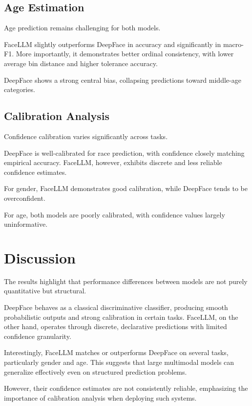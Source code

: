 \documentclass[a4paper,11pt,twocolumn]{article}
\begin{document}
\subsection{Age Estimation}

Age prediction remains challenging for both models.

FaceLLM slightly outperforms DeepFace in accuracy and significantly in macro-F1. More importantly, it demonstrates better ordinal consistency, with lower average bin distance and higher tolerance accuracy.

DeepFace shows a strong central bias, collapsing predictions toward middle-age categories.

\subsection{Calibration Analysis}

Confidence calibration varies significantly across tasks.

DeepFace is well-calibrated for race prediction, with confidence closely matching empirical accuracy. FaceLLM, however, exhibits discrete and less reliable confidence estimates.

For gender, FaceLLM demonstrates good calibration, while DeepFace tends to be overconfident.

For age, both models are poorly calibrated, with confidence values largely uninformative.

\section{Discussion}

The results highlight that performance differences between models are not purely quantitative but structural.

DeepFace behaves as a classical discriminative classifier, producing smooth probabilistic outputs and strong calibration in certain tasks. FaceLLM, on the other hand, operates through discrete, declarative predictions with limited confidence granularity.

Interestingly, FaceLLM matches or outperforms DeepFace on several tasks, particularly gender and age. This suggests that large multimodal models can generalize effectively even on structured prediction problems.

However, their confidence estimates are not consistently reliable, emphasizing the importance of calibration analysis when deploying such systems.
\end{document}
